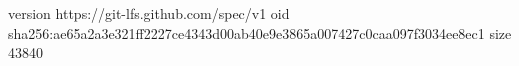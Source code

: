 version https://git-lfs.github.com/spec/v1
oid sha256:ae65a2a3e321ff2227ce4343d00ab40e9e3865a007427c0caa097f3034ee8ec1
size 43840
